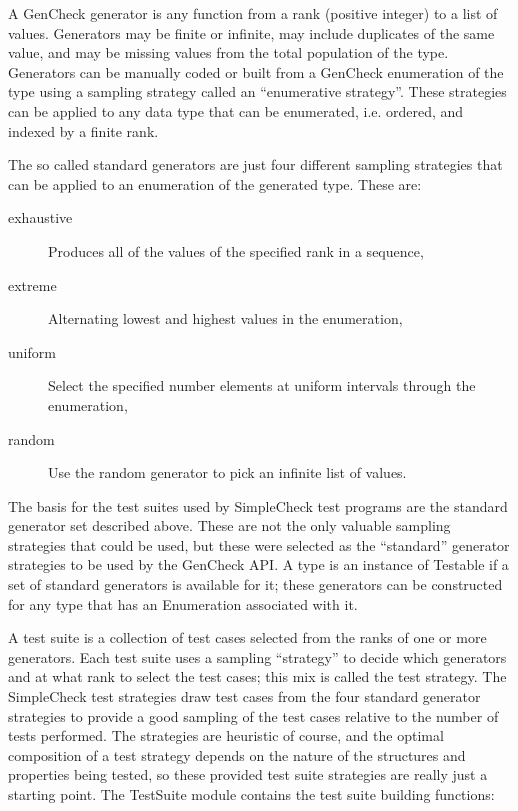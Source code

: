 A GenCheck generator is any function from a rank (positive integer) to a list of values.
Generators may be finite or infinite, may include duplicates of the same value,
and may be missing values from the total population of the type.  Generators
can be manually coded or built from a GenCheck enumeration of the type using
a sampling strategy called an ``enumerative strategy''.  These strategies can be
applied to any data type that can be enumerated, i.e. ordered, and indexed by a finite rank.

The so called standard generators are just four different sampling strategies
that can be applied to an enumeration of the generated type.  These are:

\begin{description}
\item[exhaustive] {Produces all of the values of the specified rank in a sequence,}
\item[extreme]{Alternating lowest and highest values in the enumeration,}
\item[uniform]{Select the specified number elements at uniform intervals through the enumeration,}
\item[random]{Use the random generator to pick an infinite list of values.}
\end{description}

The basis for the test suites used by SimpleCheck test programs
are the standard generator set described above.
These are not the only valuable sampling strategies that could be used, but these were
selected as the ``standard'' generator strategies to be used by the GenCheck API.
A type is an instance of Testable if a set of standard generators is available for it;
these generators can be constructed for any type that has an Enumeration associated with it. 

A test suite is a collection of test cases selected from the ranks of one or more generators.
Each test suite uses a sampling ``strategy'' to decide which generators and
at what rank to select the test cases; this mix is called the test strategy.  
The SimpleCheck test strategies draw test cases from 
the four standard generator strategies to provide a good sampling 
of the test cases relative to the number of tests performed.
The strategies are heuristic of course, and the optimal composition of a test strategy
depends on the nature of the structures and properties  being tested,
so these provided test suite strategies are really just a starting point.
The TestSuite module contains the test suite building functions:

